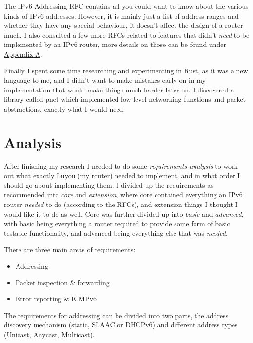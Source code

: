 \documentclass[12pt,a4paper,twoside,openright]{report}
\begin{document}
\bigskip

The IPv6 Addressing RFC\cite{ipv6_rfc_adr} contains all you could want to know about the various kinds of IPv6 addresses. However, it is mainly just a list of address ranges and whether they have any special behaviour, it doesn't affect the design of a router much.  I also consulted a few more RFCs related to features that didn't \textit{need} to be implemented by an IPv6 router, more details on those can be found under \hyperref[appendix::requirements]{Appendix A}.

\bigskip

Finally I spent some time researching and experimenting in Rust\cite{rust}, as it was a new language to me, and I didn't want to make mistakes early on in my implementation that would make things much harder later on.  I discovered a library called pnet\cite{pnet_rust} which implemented low level networking functions and packet abstractions, exactly what I would need.

\section{Analysis}

After finishing my research I needed to do some \textit{requirements analysis} to work out what exactly Luyou (my router) needed to implement, and in what order I should go about implementing them.  I divided up the requirements as recommended into \textit{core} and \textit{extension}, where core contained everything an IPv6 router \textit{needed} to do (according to the RFCs), and extension things I thought I would like it to do as well.  Core was further divided up into \textit{basic} and \textit{advanced}, with basic being everything a router required to provide some form of basic testable functionality, and advanced being everything else that was \textit{needed}.

\bigskip

There are three main areas of requirements:
\begin{itemize}
\item Addressing
\item Packet inspection \& forwarding
\item Error reporting \& ICMPv6\cite{icmpv6_rfc}
\end{itemize}

\bigskip

The requirements for addressing can be divided into two parts, the address discovery mechanism (static, SLAAC\cite{slaac_rfc} or DHCPv6\cite{dhcpv6_rfc}) and different address types (Unicast, Anycast, Multicast).  
\end{document}
